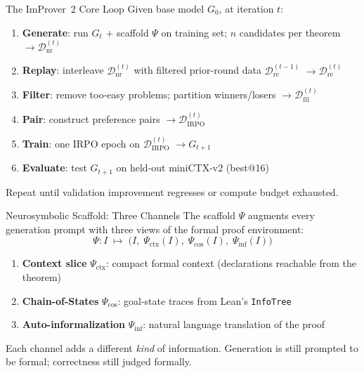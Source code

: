\documentclass{beamer}
\begin{document}
\begin{frame}{The ImProver~2 Core Loop}
\vspace{0.2em}
Given base model $G_0$, at iteration $t$:
\vspace{0.1em}
\begin{enumerate}\setlength{\itemsep}{4pt}
  \item \textbf{Generate}: run $G_t$ + scaffold $\Psi$ on training set; $n$ candidates per theorem $\to \mathcal{D}^{(t)}_{\mathrm{nr}}$
  \item \textbf{Replay}: interleave $\mathcal{D}^{(t)}_{\mathrm{nr}}$ with filtered prior-round data $\mathcal{D}^{(t-1)}_{\mathrm{re}}$ $\to \mathcal{D}^{(t)}_{\mathrm{re}}$
  \item \textbf{Filter}: remove too-easy problems; partition winners/losers $\to \mathcal{D}^{(t)}_{\mathrm{fil}}$
  \item \textbf{Pair}: construct preference pairs $\to \mathcal{D}^{(t)}_{\mathrm{IRPO}}$
  \item \textbf{Train}: one IRPO epoch on $\mathcal{D}^{(t)}_{\mathrm{IRPO}}$ $\to G_{t+1}$
  \item \textbf{Evaluate}: test $G_{t+1}$ on held-out miniCTX-v2 (best@16)
\end{enumerate}
\vspace{0.3em}
\small Repeat until validation improvement regresses or compute budget exhausted.
\end{frame}

\begin{frame}{Neurosymbolic Scaffold: Three Channels}
\vspace{0.3em}
The scaffold $\Psi$ augments every generation prompt with three views of the formal proof environment:
\[
  \Psi: I \;\mapsto\; \bigl(I,\; \Psi_{\mathrm{ctx}}(I),\; \Psi_{\mathrm{cos}}(I),\; \Psi_{\mathrm{inf}}(I)\bigr)
\]
\vspace{0.2em}
\begin{enumerate}\setlength{\itemsep}{6pt}
  \item \textbf{Context slice} $\Psi_{\mathrm{ctx}}$: compact formal context (declarations reachable from the theorem)
  \item \textbf{Chain-of-States} $\Psi_{\mathrm{cos}}$: goal-state traces from Lean's \texttt{InfoTree}
  \item \textbf{Auto-informalization} $\Psi_{\mathrm{inf}}$: natural language translation of the proof
\end{enumerate}
\vspace{0.3em}
\small Each channel adds a different \emph{kind} of information. Generation is still prompted to be formal; correctness still judged formally.
\end{frame}
\end{document}
